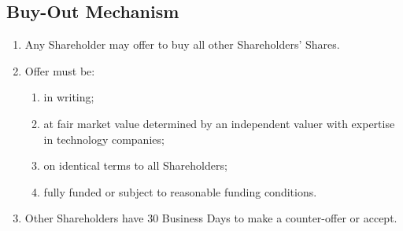 \subsection{Buy-Out Mechanism}
\begin{enumerate}[label=(\alph*)]
\item Any Shareholder may offer to buy all other Shareholders' Shares.
\item Offer must be:
    \begin{enumerate}[label=(\roman*)]
    \item in writing;
    \item at fair market value determined by an independent valuer with expertise in technology companies;
    \item on identical terms to all Shareholders;
    \item fully funded or subject to reasonable funding conditions.
    \end{enumerate}
\item Other Shareholders have 30 Business Days to make a counter-offer or accept.
\end{enumerate}

